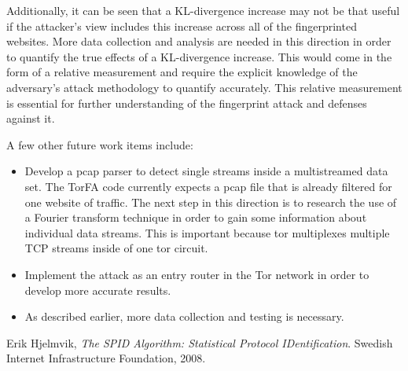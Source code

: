 \documentclass{article}
\begin{document}
Additionally, it can be seen that a KL-divergence increase may not be that 
useful if the attacker's view includes this increase across all of the 
fingerprinted websites. More data collection and analysis are needed in this 
direction in order to quantify the true effects of a KL-divergence increase. 
This would come in the form of a relative measurement and require the explicit 
knowledge of the adversary's attack methodology to quantify accurately. This 
relative measurement is essential for further understanding of the fingerprint 
attack and defenses against it.

A few other future work items include: 
\begin{itemize}
	\item Develop a pcap parser to detect single streams inside a 
		multistreamed data set. The TorFA code currently expects a pcap
		file that is already filtered for one website of traffic. The next
		step in this direction is to research the use of a Fourier transform 
		technique in order to gain some information about individual data 
		streams. This is important because tor multiplexes multiple TCP 
		streams inside of one tor circuit.
	\item Implement the attack as an entry router in the Tor network in order
		 to develop more accurate results. 
	\item As described earlier, more data collection and testing is necessary. 
\end{itemize}

\begin{thebibliography}{9}
		Erik Hjelmvik,
		\emph{The SPID Algorithm: Statistical Protocol IDentification}.
		Swedish Internet Infrastructure Foundation, 2008.
\end{thebibliography}

\appendix

%

%

%
\end{document}
